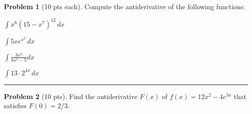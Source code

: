 \documentclass[12pt]{article}
\theoremstyle{definition}
\newtheorem{problem}{Problem}
\begin{document}
\bigskip
\begin{problem}[10 pts each]
Compute the antiderivative of the following functions:
\item $\displaystyle{\int x^6 (15 - x^7)^{12}\, dx}$
\vspace{3.5cm}
\item $\displaystyle{\int  5x e^{x^2} \, dx}$
\vspace{3.5cm}
\item $\displaystyle{\int \frac{3x^2}{8x^3-5} dx}$
\vspace{3.5cm}
\item $\displaystyle{\int 13 \cdot 2^{4x}\, dx}$
\vspace{2.5cm}
\end{problem}
\hrule

\begin{problem}[10 pts]
Find the antiderivative $F(x)$ of $f(x)=12x^2 - 4e^{3x}$ that satisfies $F(0)=2/3$.
\end{problem}
\end{document}
